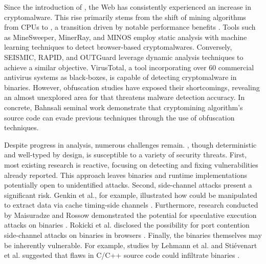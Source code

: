  Since the introduction of \Wasm, the Web has consistently experienced an increase in cryptomalware. 
This rise primarily stems from the shift of mining algorithms from CPUs to \Wasm, a transition driven by notable performance benefits \cite{musch2019new}.
Tools such as MineSweeper\cite{Minesweeper}, MinerRay\cite{MinerRay}, and MINOS\cite{MINOS} employ static analysis with machine learning techniques to detect browser-based cryptomalwares.
Conversely, SEISMIC\cite{SEISMIC}, RAPID\cite{RAPID}, and OUTGuard\cite{outguard} leverage dynamic analysis techniques to achieve a similar objective.
VirusTotal, a tool incorporating over 60 commercial antivirus systems as black-boxes, is capable of detecting cryptomalware in \Wasm binaries.
However, obfuscation studies have exposed their shortcomings, revealing an almost unexplored area for \Wasm that threatens malware detection accuracy.
In concrete, Bahnsali \etal seminal work\cite{10.1145/3507657.3528560} demonstrate that cryptomining algorithm's source code can evade previous techniques through the use of obfuscation techniques.



\label{background:wasm:challenges} 
Despite progress in \Wasm analysis, numerous challenges remain. 
\Wasm, though deterministic and well-typed by design, is susceptible to a variety of security threats. 
First, most existing \Wasm research is reactive, focusing on detecting and fixing vulnerabilities already reported. 
This approach leaves \Wasm binaries and runtime implementations potentially open to unidentified attacks. 
Second, side-channel attacks present a significant risk. 
Genkin et al., for example, illustrated how \Wasm could be manipulated to extract data via cache timing-side channels \cite{Genkin2018DrivebyKC}. 
Furthermore, research conducted by Maisuradze and Rossow demonstrated the potential for speculative execution attacks on \Wasm binaries \cite{ret2spec}. 
Rokicki et al. disclosed the possibility for port contention side-channel attacks on \Wasm binaries in browsers \cite{10.1145/3488932.3517411}. 
Finally, the binaries themselves may be inherently vulnerable. 
For example, studies by Lehmann et al. and Stiévenart et al. suggested that flaws in C/C++ source code could infiltrate \Wasm binaries \cite{usenixWasm2020, DeRoover2022}.
 
